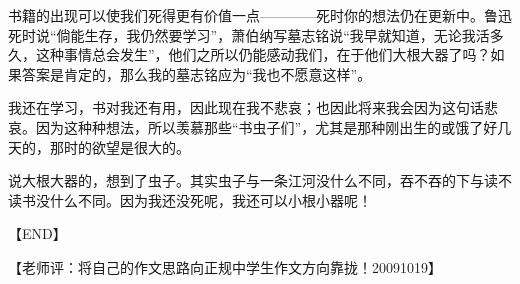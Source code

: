\documentclass[UTF8]{book}
\begin{document}
书籍的出现可以使我们死得更有价值一点————死时你的想法仍在更新中。鲁迅死时说“倘能生存，我仍然要学习”，萧伯纳写墓志铭说“我早就知道，无论我活多久，这种事情总会发生”，他们之所以仍能感动我们，在于他们大根大器了吗？如果答案是肯定的，那么我的墓志铭应为“我也不愿意这样”。

我还在学习，书对我还有用，因此现在我不悲哀；也因此将来我会因为这句话悲哀。因为这种种想法，所以羡慕那些“书虫子们”，尤其是那种刚出生的或饿了好几天的，那时的欲望是很大的。

说大根大器的，想到了虫子。其实虫子与一条江河没什么不同，吞不吞的下与读不读书没什么不同。因为我还没死呢，我还可以小根小器呢！

【END】

【老师评：将自己的作文思路向正规中学生作文方向靠拢！20091019】
\end{document}
